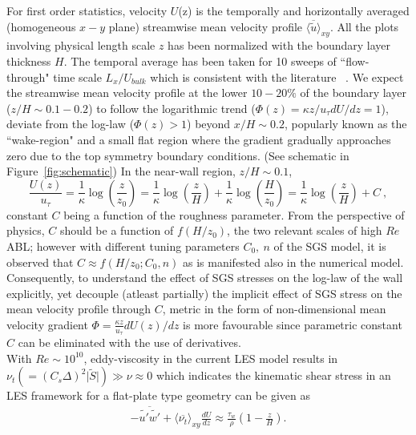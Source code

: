 For first order statistics, velocity $U${(z)} is the temporal{ly} and horizontally averaged (homogeneous $x-y$ plane) streamwise mean velocity profile ${\langle \overline{\widetilde{u}}\rangle_{xy}}$. All the plots involving physical length scale $z$ has been normalized with the boundary layer thickness $H$. The temporal average has been taken for 10 sweeps of ``flow-through" time scale $L_x/U_{bulk}$ which is consistent with the literature ~\cite{kimmoinmoser}. We expect the streamwise mean velocity profile {at the lower $10-20 \%$ of the boundary layer ($z/H \sim 0.1-0.2$) to follow the logarithmic trend ($\Phi(z) = \kappa z/u_{\tau} dU/dz = 1$), deviate from the log-law ($\Phi(z) > 1$) beyond $x/H \sim 0.2$, popularly known as the ``wake-region" and a small flat region where the gradient gradually approaches zero due to the top symmetry boundary conditions. (See schematic in Figure~\ref{fig:schematic})} In the near-wall region, $z/H \sim 0.1$, $$\frac{{U(z)}}{u_{\tau}} = \frac{1}{\kappa}\log (\frac{z}{z_0}) = \frac{1}{\kappa}\log (\frac{z}{H}) + \frac{1}{\kappa}\log (\frac{H}{z_0}) = \frac{1}{\kappa}\log (\frac{z}{H}) + C \ ,$$ constant $C$ being a function of the roughness parameter. {From the perspective of physics, $C$ should be a function of $f(H/z_0)$, the two relevant scales of high $Re$ ABL; however with different tuning parameters $C_0, \ n$ of the SGS model, it is observed that $C \approx f(H/z_0; C_0,n)$ as is manifested also in the numerical model.}  
Consequently, to understand the effect of SGS stresses on the log-law of the wall explicitly, yet decouple (atleast partially) the implicit effect of SGS stress on the mean velocity profile through $C$, metric in the form of non-dimensional mean velocity gradient $\Phi = \frac{\kappa z}{u_{\tau}} dU(z)/dz$ is more favourable since parametric constant $C$ can be eliminated with the use of derivatives.\\
 With $Re \sim 10^{10}$, eddy-viscosity in the current LES model results in $\nu_{t} (= (C_s\Delta)^2 \vert \widetilde{S} \vert) \gg \nu \approx 0$ which indicates the kinematic shear stress in an LES framework for a flat-plate type geometry can be given as
  \begin{align}
-\overline{\widetilde{u'}\widetilde{w'}} + \langle\overline{\nu_{t}} \rangle_{xy} \frac{d U}{d z} \approx \frac{\tau_{w}}{\rho}\left(1 - \frac{z}{H}\right). \label{mean}
\end{align}
